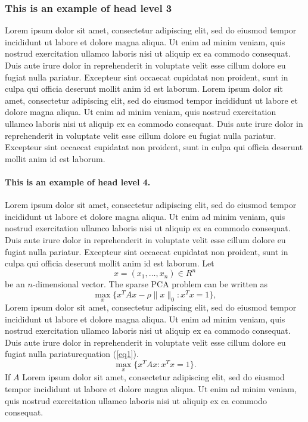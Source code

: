 \documentclass[english]{sbc2025}%
\begin{document}
\subsubsection{This is an example of head level 3}
Lorem ipsum dolor sit amet, consectetur adipiscing elit, sed do eiusmod tempor incididunt ut labore et dolore magna aliqua. Ut enim ad minim veniam, quis nostrud exercitation ullamco laboris nisi ut aliquip ex ea commodo consequat. Duis aute irure dolor in reprehenderit in voluptate velit esse cillum dolore eu fugiat nulla pariatur. Excepteur sint occaecat cupidatat non proident, sunt in culpa qui officia deserunt mollit anim id est laborum. Lorem ipsum dolor sit amet, consectetur adipiscing elit, sed do eiusmod tempor incididunt ut labore et dolore magna aliqua. Ut enim ad minim veniam, quis nostrud exercitation ullamco laboris nisi ut aliquip ex ea commodo consequat. Duis aute irure dolor in reprehenderit in voluptate velit esse cillum dolore eu fugiat nulla pariatur. Excepteur sint occaecat cupidatat non proident, sunt in culpa qui officia deserunt mollit anim id est laborum.

\paragraph{This is an example of head level 4.}
Lorem ipsum dolor sit amet, consectetur adipiscing elit, sed do eiusmod tempor incididunt ut labore et dolore magna aliqua. Ut enim ad minim veniam, quis nostrud exercitation ullamco laboris nisi ut aliquip ex ea commodo consequat. Duis aute irure dolor in reprehenderit in voluptate velit esse cillum dolore eu fugiat nulla pariatur. Excepteur sint occaecat cupidatat non proident, sunt in culpa qui officia deserunt mollit anim id est laborum. 
Let
\[
x=(x_1,\dots,x_n)\in R^n
\]be an \(n\)-dimensional vector. The sparse PCA problem can be written as
\begin{equation}\label{eq1}
\max\limits_{x}\{x^TAx-\rho\|x\|_0:x^Tx=1\},
\end{equation}
Lorem ipsum dolor sit amet, consectetur adipiscing elit, sed do eiusmod tempor incididunt ut labore et dolore magna aliqua. Ut enim ad minim veniam, quis nostrud exercitation ullamco laboris nisi ut aliquip ex ea commodo consequat. Duis aute irure dolor in reprehenderit in voluptate velit esse cillum dolore eu fugiat nulla pariatur\break equation (\ref{eq1}). 
\[\max\limits_{x}\{x^TAx :x^Tx=1\}.\]
If $A$ Lorem ipsum dolor sit amet, consectetur adipiscing elit, sed do eiusmod tempor incididunt ut labore et dolore magna aliqua. Ut enim ad minim veniam, quis nostrud exercitation ullamco laboris nisi ut aliquip ex ea commodo consequat. 
\end{document}
